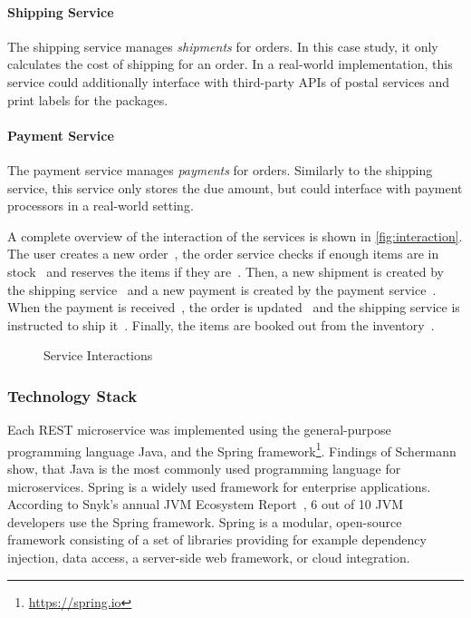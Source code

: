 \paragraph{Shipping Service}

The shipping service manages \textit{shipments} for orders.
In this case study, it only calculates the cost of shipping for an order.
In a real-world implementation, this service could additionally interface with third-party \acp{API} of postal services and print labels for the packages.

\paragraph{Payment Service}

The payment service manages \textit{payments} for orders.
Similarly to the shipping service, this service only stores the due amount, but could interface with payment processors in a real-world setting.


A complete overview of the interaction of the services is shown in \autoref{fig:interaction}.
The user creates a new order~, the order service checks if enough items are in stock~ and reserves the items if they are~.
Then, a new shipment is created by the shipping service~ and a new payment is created by the payment service~.
When the payment is received~, the order is updated~ and the shipping service is instructed to ship it~.
Finally, the items are booked out from the inventory~.

\begin{figure}[!htb]
    \centering
    
    \caption{Service Interactions}\label{fig:interaction}
\end{figure}

\subsubsection{Technology Stack}\label{sec:rest-tech}

Each \acs{REST} microservice was implemented using the general-purpose programming language Java, and the Spring framework\footnote{\url{https://spring.io}}.
Findings of Schermann~\cite{Schermann2015} show, that Java is the most commonly used programming language for microservices.
Spring is a widely used framework for enterprise applications.
According to Snyk's annual \acs{JVM} Ecosystem Report~\cite{Vermeer2020}, 6 out of 10 \acs{JVM} developers use the Spring framework.
Spring is a modular, open-source framework consisting of a set of libraries providing for example dependency injection, data access, a server-side web framework, or cloud integration.

